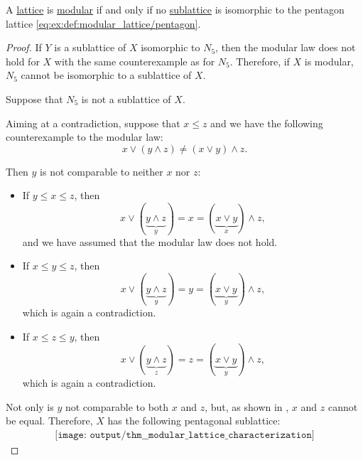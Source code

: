 \begin{proposition}\label{thm:modular_lattice_characterization}
  A \hyperref[def:lattice]{lattice} is \hyperref[def:modular_lattice]{modular} if and only if no \hyperref[def:lattice/submodel]{sublattice} is isomorphic to the pentagon lattice \eqref{eq:ex:def:modular_lattice/pentagon}.
\end{proposition}
\begin{proof}
  \SufficiencySubProof If \( Y \) is a sublattice of \( X \) isomorphic to \( N_5 \), then the modular law does not hold for \( X \) with the same counterexample  as for \( N_5 \). Therefore, if \( X \) is modular, \( N_5 \) cannot be isomorphic to a sublattice of \( X \).

  \NecessitySubProof Suppose that \( N_5 \) is not a sublattice of \( X \).

  Aiming at a contradiction, suppose that \( x \leq z \) and we have the following counterexample to the modular law:
  \begin{equation*}
    x \vee (y \wedge z) \neq (x \vee y) \wedge z.
  \end{equation*}

  Then \( y \) is not comparable to neither \( x \) nor \( z \):
  \begin{itemize}
    \item If \( y \leq x \leq z \), then
    \begin{equation*}
      x \vee (\underbrace{y \wedge z}_{y}) = x = (\underbrace{x \vee y}_{x}) \wedge z,
    \end{equation*}
    and we have assumed that the modular law does not hold.

    \item If \( x \leq y \leq z \), then
    \begin{equation*}
      x \vee (\underbrace{y \wedge z}_{y}) = y = (\underbrace{x \vee y}_{y}) \wedge z,
    \end{equation*}
    which is again a contradiction.

    \item If \( x \leq z \leq y \), then
    \begin{equation*}
      x \vee (\underbrace{y \wedge z}_{z}) = z = (\underbrace{x \vee y}_{y}) \wedge z,
    \end{equation*}
    which is again a contradiction.
  \end{itemize}

  Not only is \( y \) not comparable to both \( x \) and \( z \), but, as shown in , \( x \) and \( z \) cannot be equal. Therefore, \( X \) has the following pentagonal sublattice:
  \begin{equation}\label{eq:thm:modular_lattice_characterization/pentagonal}
    \begin{aligned}
      \texttt{[image: output/thm\_\_modular\_lattice\_characterization]}
    \end{aligned}
  \end{equation}


\end{proof}

